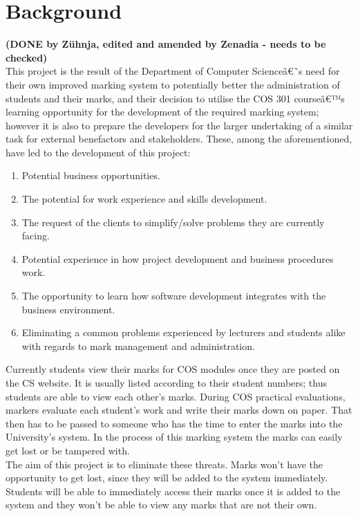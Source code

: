 \documentclass[11pt,a4paper]{article}
\begin{document}
\section{Background}
\textbf{(DONE by Z\"uhnja, edited and amended by Zenadia - needs to be checked)}\\
This project is the result of the Department of Computer Scienceâ€˜s need for their own improved marking system to potentially better the administration of students and their marks, and their decision to utilise the COS 301 courseâ€™s learning opportunity for the development of the required marking system; however it is also to prepare the developers for the larger undertaking of a similar task for external benefactors and stakeholders. These, among the aforementioned, have led to the development of this project:
\begin{enumerate}
	\item Potential business opportunities.
	\item The potential for work experience and skills development.
	\item The request of the clients to simplify/solve problems they are currently facing.
	\item Potential experience in how project development and business procedures work.
	\item The opportunity to learn how software development integrates with the business environment.
	\item Eliminating a common problems experienced by lecturers and students alike with regards to mark management and administration.
\end{enumerate}
Currently students view their marks for COS modules once they are posted on the CS website.  It is usually listed according to their student numbers; thus students are able to view each other's marks. 
During COS practical evaluations, markers evaluate each student's work and write their marks down on paper. That then has to be passed to someone who has the time to enter the marks into the University's system. In the process of this marking system the marks can easily get lost or be tampered with. \\
The aim of this project is to eliminate these threats. Marks won't have the opportunity to get lost, since they will be added to the system immediately. Students will be able to immediately access their marks once it is added to the system and they won't be able to view any marks that are not their own. 
\end{document}
